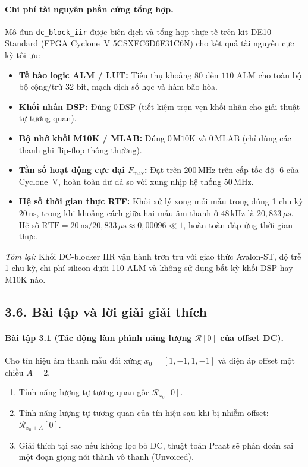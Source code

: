 \paragraph{Chi phí tài nguyên phần cứng tổng hợp.}
Mô-đun \texttt{dc\_block\_iir} được biên dịch và tổng hợp thực tế trên kit DE10-Standard (FPGA Cyclone~V 5CSXFC6D6F31C6N) cho kết quả tài nguyên cực kỳ tối ưu:
\begin{itemize}
    \item \textbf{Tế bào logic ALM / LUT:} Tiêu thụ khoảng $80$ đến $110$ ALM cho toàn bộ bộ cộng/trừ 32 bit, mạch dịch số học và hàm bão hòa.
    \item \textbf{Khối nhân DSP:} Đúng $0\,\text{DSP}$ (tiết kiệm trọn vẹn khối nhân cho giải thuật tự tương quan).
    \item \textbf{Bộ nhớ khối M10K / MLAB:} Đúng $0\,\text{M10K}$ và $0\,\text{MLAB}$ (chỉ dùng các thanh ghi flip-flop thông thường).
    \item \textbf{Tần số hoạt động cực đại $F_{\max}$:} Đạt trên $200\,\text{MHz}$ trên cấp tốc độ -6 của Cyclone~V, hoàn toàn dư dả so với xung nhịp hệ thống $50\,\text{MHz}$.
    \item \textbf{Hệ số thời gian thực RTF:} Khối xử lý xong mỗi mẫu trong đúng 1 chu kỳ $20\,\text{ns}$, trong khi khoảng cách giữa hai mẫu âm thanh ở $48\,\text{kHz}$ là $20{,}833\,\mu\mathrm{s}$. Hệ số $\mathrm{RTF} = 20\,\text{ns} / 20{,}833\,\mu\mathrm{s} \approx 0{,}00096 \ll 1$, hoàn toàn đáp ứng thời gian thực.
\end{itemize}

\textit{Tóm lại:} Khối DC-blocker IIR vận hành trơn tru với giao thức Avalon-ST, độ trễ 1 chu kỳ, chi phí silicon dưới 110 ALM và không sử dụng bất kỳ khối DSP hay M10K nào.

\subsection*{3.6. Bài tập và lời giải giải thích}

\paragraph{Bài tập 3.1 (Tác động làm phình năng lượng $\mathcal{R}[0]$ của offset DC).}
Cho tín hiệu âm thanh mẫu đối xứng $x_0 = [1, -1, 1, -1]$ và điện áp offset một chiều $A = 2$.
\begin{enumerate}[label=\alph*)]
    \item Tính năng lượng tự tương quan gốc $\mathcal{R}_{x_0}[0]$.
    \item Tính năng lượng tự tương quan của tín hiệu sau khi bị nhiễm offset: $\mathcal{R}_{x_0+A}[0]$.
    \item Giải thích tại sao nếu không lọc bỏ DC, thuật toán Praat sẽ phán đoán sai một đoạn giọng nói thành vô thanh (Unvoiced).
\end{enumerate}

